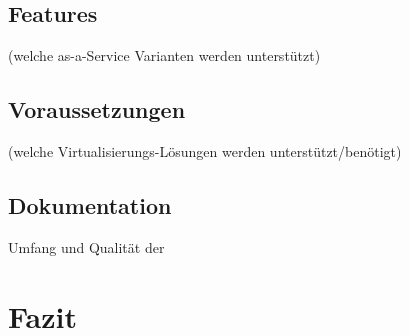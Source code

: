 \documentclass[a4paper,nochapterprefix,ngerman,12pt]{scrreprt}
\begin{document}
\section{Features}
(welche as-a-Service Varianten werden unterstützt)
\section{Voraussetzungen}
(welche Virtualisierungs-Lösungen werden unterstützt/benötigt)
\section{Dokumentation}
Umfang und Qualität der

\chapter{Fazit} \thispagestyle{fancy}

 \thispagestyle{fancy}
 \thispagestyle{fancy}

\listoffigures \thispagestyle{fancy}

\printglossary[style=tree,title={Glossar}]  \thispagestyle{fancy}

\label{lastpage}
\end{document}
